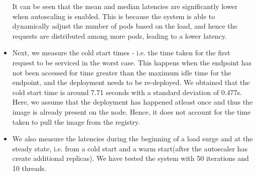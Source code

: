 \documentclass{article}
\begin{document}
\begin{itemize}
    It can be seen that the mean and median latencies are significantly lower when autoscaling is enabled. This is because the system is able to dynamically adjust the number of pods based on the load, and hence the requests are distributed among more pods, leading to a lower latency.

    \item Next, we measure the cold start times - i.e. the time taken for the first request to be serviced in the worst case. This happens when the endpoint has not been accessed for time greater than the maximum idle time for the endpoint, and the deployment needs to be re-deployed. We obtained that the cold start time is around 7.71 seconds with a standard deviation of 0.477s. Here, we assume that the deployment has happened atleast once and thus the image is already present on the node. Hence, it does not account for the time taken to pull the image from the registry.
    
    \item We also measure the latencies during the beginning of a load surge and at the steady state, i.e. from a cold start and a warm start(after the autoscaler has create additional replicas). We have tested the system with 50 iterations and 10 threads. 
    

\end{itemize}
\end{document}
